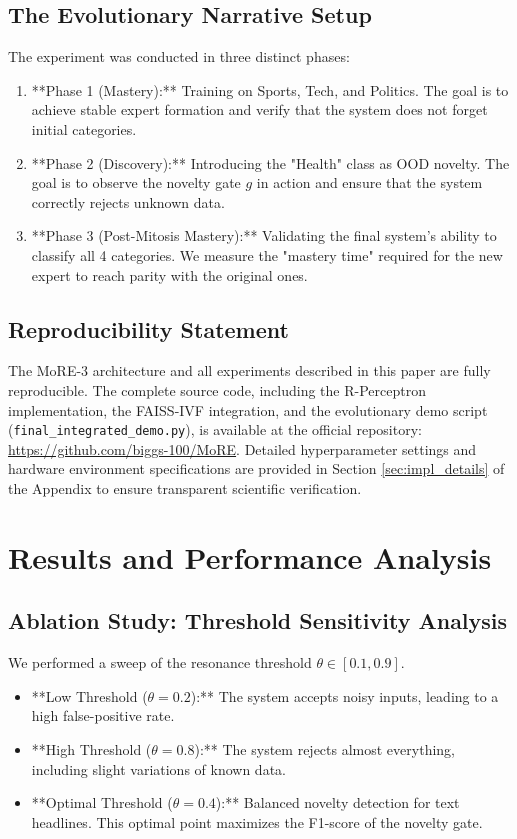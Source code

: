 \documentclass[11pt,hidelinks]{article}
\begin{document}
\subsection{The Evolutionary Narrative Setup}
The experiment was conducted in three distinct phases:
\begin{enumerate}
    \item **Phase 1 (Mastery):** Training on Sports, Tech, and Politics. The goal is to achieve stable expert formation and verify that the system does not forget initial categories.
    \item **Phase 2 (Discovery):** Introducing the "Health" class as OOD novelty. The goal is to observe the novelty gate $g$ in action and ensure that the system correctly rejects unknown data.
    \item **Phase 3 (Post-Mitosis Mastery):** Validating the final system's ability to classify all 4 categories. We measure the "mastery time" required for the new expert to reach parity with the original ones.
\end{enumerate}

\subsection{Reproducibility Statement}
The MoRE-3 architecture and all experiments described in this paper are fully reproducible. The complete source code, including the R-Perceptron implementation, the FAISS-IVF integration, and the evolutionary demo script (\texttt{final\_integrated\_demo.py}), is available at the official repository: \url{https://github.com/biggs-100/MoRE}. Detailed hyperparameter settings and hardware environment specifications are provided in Section \ref{sec:impl_details} of the Appendix to ensure transparent scientific verification.

\section{Results and Performance Analysis}
\subsection{Ablation Study: Threshold Sensitivity Analysis}
We performed a sweep of the resonance threshold $\theta \in [0.1, 0.9]$.
\begin{itemize}
    \item **Low Threshold ($\theta = 0.2$):** The system accepts noisy inputs, leading to a high false-positive rate.
    \item **High Threshold ($\theta = 0.8$):** The system rejects almost everything, including slight variations of known data.
    \item **Optimal Threshold ($\theta = 0.4$):** Balanced novelty detection for text headlines. This optimal point maximizes the F1-score of the novelty gate.
\end{itemize}
\end{document}
